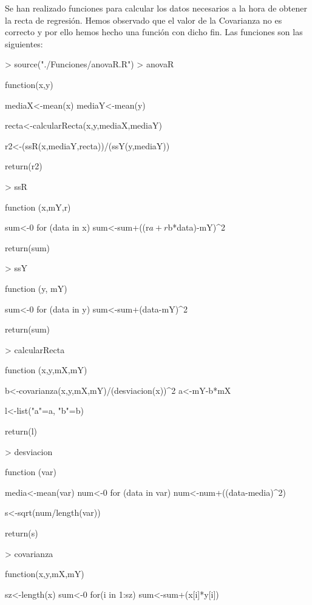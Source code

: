 \documentclass [a4paper] {article}
\begin{document}
\bigskip
Se han realizado funciones para calcular los datos necesarios a la hora de obtener la recta de regresión. Hemos observado que
el valor de la Covarianza no es correcto y por ello hemos hecho una función con dicho fin. Las funciones son las siguientes:
\begin{Schunk}
\begin{Sinput}
> source("./Funciones/anovaR.R")
> anovaR
\end{Sinput}
\begin{Soutput}
function(x,y) {
    mediaX<-mean(x)
    mediaY<-mean(y)

    recta<-calcularRecta(x,y,mediaX,mediaY)

    r2<-(ssR(x,mediaY,recta))/(ssY(y,mediaY))

    return(r2)
}
\end{Soutput}
\begin{Sinput}
> ssR
\end{Sinput}
\begin{Soutput}
function (x,mY,r) {
    sum<-0
    for (data in x){
        sum<-sum+((r$a+r$b*data)-mY)^2
    }

    return(sum)
}
\end{Soutput}
\begin{Sinput}
> ssY
\end{Sinput}
\begin{Soutput}
function (y, mY) {
    sum<-0
    for (data in y){
        sum<-sum+(data-mY)^2
    }
    
    return(sum)
}
\end{Soutput}
\begin{Sinput}
> calcularRecta
\end{Sinput}
\begin{Soutput}
function (x,y,mX,mY) {
    b<-covarianza(x,y,mX,mY)/(desviacion(x))^2
    a<-mY-b*mX

    l<-list("a"=a, "b"=b)

    return(l)
}
\end{Soutput}
\begin{Sinput}
> desviacion
\end{Sinput}
\begin{Soutput}
function (var) {
    media<-mean(var)
    num<-0
    for (data in var){
        num<-num+((data-media)^2)
    }

    s<-sqrt(num/length(var))

    return(s)
}
\end{Soutput}
\begin{Sinput}
> covarianza
\end{Sinput}
\begin{Soutput}
function(x,y,mX,mY){
    sz<-length(x)
    sum<-0
    for(i in 1:sz){
        sum<-sum+(x[i]*y[i])
    }

}
\end{Soutput}
\end{Schunk}
\end{document}
